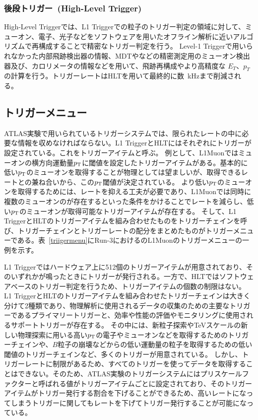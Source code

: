 \subsubsection{後段トリガー~(High-Level Trigger)}
High-Level Triggerでは、L1 Triggerでの粒子のトリガー判定の領域に対して、ミューオン、電子、光子などをソフトウェアを用いたオフライン解析に近いアルゴリズムで再構成することで精密なトリガー判定を行う。
Level-1 Triggerで用いられなかった内部飛跡検出器の情報、MDTやなどの精密測定用のミューオン検出器及び、カロリメータの情報などを用いて、飛跡再構成やより高精度な $E_T$、$p_T$ の計算を行う。トリガーレートはHLTを用いて最終的に数~kHzまで削減される。

\subsection{トリガーメニュー}
ATLAS実験で用いられているトリガーシステムでは、限られたレートの中に必要な情報を収めなければならない。L1 TriggerとHLTにはそれぞれにトリガーが設定されている。これをトリガーアイテムと呼ぶ。
例として、L1Muonではミューオンの横方向運動量$p_{\rm{T}}$に閾値を設定したトリガーアイテムがある。基本的に低い$p_{\rm{T}}$のミューオンを取得することが物理としては望ましいが、取得できるレートとの兼ね合いから、この$p_{\rm{T}}$閾値が決定されている。
より低い$p_{\rm{T}}$のミューオンを取得するためには、レートを抑える工夫が必要であり、L1Muonでは同時に複数のミューオンのが存在するといった条件をかけることでレートを減らし、低い$p_{\rm{T}}$のミューオンが取得可能なトリガーアイテムが存在する。
そして、L1 TriggerとHLTのトリガーアイテムを組み合わせたものをトリガーチェインを呼び、トリガーチェインとトリガーレートの配分をまとめたものがトリガーメニューである。表~\ref{triigermenu}にRun-3におけるのL1Muonのトリガーメニューの一例を示す。

L1 Triggerではハードウェア上に512個のトリガーアイテムが用意されており、そのいずれかが鳴ったときにトリガーが発行される。一方で、HLTではソフトウェアベースのトリガー判定を行うため、トリガーアイテムの個数の制限はない。
L1 TriggerとHLTのトリガーアイテムを組み合わせたトリガーチェインは大きく分けて2種類であり、物理解析に使用されるデータの収集のための主要なトリガーであるプライマリートリガーと、効率や性能の評価やモニタリングに使用されるサポートトリガーが存在する。
その中には、新粒子探索やTeVスケールの新しい物理探索に用いる高い$p_{\rm{T}}$の電子やミューオンなどを取得するためのトリガーチェインや、$B$粒子の崩壊などからの低い運動量の粒子を取得するための低い閾値のトリガーチェインなど、多くのトリガーが用意されている。
しかし、トリガーレートに制限があるため、すべてのトリガーを使ってデータを取得することはできない。そのため、ATLAS実験のトリガーシステムにはプリスケールファクターと呼ばれる値がトリガーアイテムごとに設定されており、そのトリガーアイテムがトリガー発行する割合を下げることができるため、高いレートになってしまうトリガーに関してもレートを下げてトリガー発行することが可能になっている。

